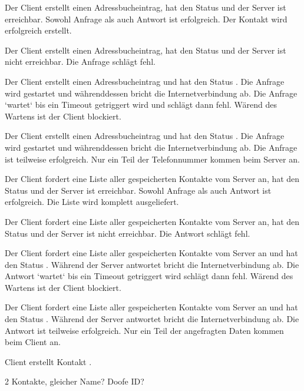\begin{description}[leftmargin=0.7cm,style=nextline]
\item[Szenario A0:]
Der Client erstellt einen Adressbucheintrag, hat den Status  und der Server ist erreichbar. Sowohl Anfrage als auch Antwort ist erfolgreich. Der Kontakt wird erfolgreich erstellt.\\
\item[Szenario A1:]
Der Client erstellt einen Adressbucheintrag, hat den Status  und der Server ist nicht erreichbar. Die Anfrage schlägt fehl.\\
\item[Szenario A2:]
Der Client erstellt einen Adressbucheintrag und hat den Status . Die Anfrage wird gestartet und währenddessen bricht die Internetverbindung ab. Die Anfrage `wartet` bis ein Timeout getriggert wird und schlägt dann fehl. Wärend des Wartens ist der Client blockiert.\\
\item[Szenario A3:]
Der Client erstellt einen Adressbucheintrag und hat den Status . Die Anfrage wird gestartet und währenddessen bricht die Internetverbindung ab. Die Anfrage ist teilweise erfolgreich. Nur ein Teil der Telefonnummer kommen beim Server an.\\
\item[Szenario S0:]
Der Client fordert eine Liste aller gespeicherten Kontakte vom Server an, hat den Status  und der Server ist erreichbar. Sowohl Anfrage als auch Antwort ist erfolgreich. Die Liste wird komplett ausgeliefert.\\
\item[Szenario S1:]
Der Client fordert eine Liste aller gespeicherten Kontakte vom Server an, hat den Status  und der Server ist nicht erreichbar. Die Antwort schlägt fehl.\\
\item[Szenario S2:]
Der Client fordert eine Liste aller gespeicherten Kontakte vom Server an und hat den Status . Während der Server antwortet bricht die Internetverbindung ab. Die Antwort `wartet` bis ein Timeout getriggert wird schlägt dann fehl. Wärend des Wartens ist der Client blockiert.\\
\item[Szenario S3:]
Der Client fordert eine Liste aller gespeicherten Kontakte vom Server an und hat den Status . Während der Server antwortet bricht die Internetverbindung ab. Die Antwort ist teilweise erfolgreich. Nur ein Teil der angefragten Daten kommen beim Client an.\\
\item[Szenario K0:]
Client erstellt Kontakt . 
\item[Szenario K1:]
2 Kontakte, gleicher Name? Doofe ID?
\end{description}
